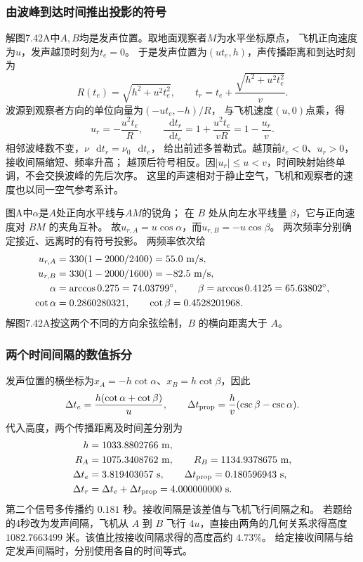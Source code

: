 \documentclass[UTF8,fontset=fandol,a4paper,11pt]{ctexart}
\newcommand{\dd}{\mathop{}\!\mathrm{d}}
\begin{document}
\subsubsection*{由波峰到达时间推出投影的符号}
解图7.42A中$A,B$均是发声位置。取地面观察者$M$为水平坐标原点，
飞机正向速度为$u$，发声越顶时刻为$t_e=0$。
于是发声位置为$(ut_e,h)$，声传播距离和到达时刻为
\[
R(t_e)=\sqrt{h^2+u^2t_e^2},\qquad
t_r=t_e+\frac{\sqrt{h^2+u^2t_e^2}}v.
\]
波源到观察者方向的单位向量为$(-ut_e,-h)/R$，
与飞机速度$(u,0)$点乘，得
\[
u_r=-\frac{u^2t_e}{R},\qquad
\frac{\dd t_r}{\dd t_e}
=1+\frac{u^2t_e}{vR}=1-\frac{u_r}{v}.
\]
相邻波峰数不变，$\nu\,\dd t_r=\nu_0\,\dd t_e$，
给出前述多普勒式。越顶前$t_e<0$、$u_r>0$，接收间隔缩短、频率升高；
越顶后符号相反。因$|u_r|\le u<v$，时间映射始终单调，不会交换波峰的先后次序。
这里的声速相对于静止空气，飞机和观察者的速度也以同一空气参考系计。

图A中$\alpha$是$A$处正向水平线与$AM$的锐角；
在 $B$ 处从向左水平线量 $\beta$，它与正向速度对 $BM$ 的夹角互补。
故$u_{r,A}=u\cos\alpha$，而$u_{r,B}=-u\cos\beta$。
两次频率分别确定接近、远离时的有符号投影。
两频率依次给
\[
\begin{aligned}
u_{r,A}&=330(1-2000/2400)=55.0\ {\rm m/s},\\
u_{r,B}&=330(1-2000/1600)=-82.5\ {\rm m/s},\\
\alpha&=\arccos0.275=74.03799^\circ,\qquad
\beta=\arccos0.4125=65.63802^\circ,\\
\cot\alpha&=0.2860280321,\qquad
\cot\beta=0.4528201968.
\end{aligned}
\]
解图7.42A按这两个不同的方向余弦绘制，$B$ 的横向距离大于 $A$。

\subsubsection*{两个时间间隔的数值拆分}
发声位置的横坐标为$x_A=-h\cot\alpha$、$x_B=h\cot\beta$，因此
\[
\Delta t_e=\frac{h(\cot\alpha+\cot\beta)}u,\qquad
\Delta t_{\rm prop}=\frac hv(\csc\beta-\csc\alpha).
\]
代入高度，两个传播距离及时间差分别为
\[
\begin{aligned}
h&=1033.8802766\ {\rm m},\\
R_A&=1075.3408762\ {\rm m},\qquad
R_B=1134.9378675\ {\rm m},\\
\Delta t_e&=3.819403057\ {\rm s},\qquad
\Delta t_{\rm prop}=0.180596943\ {\rm s},\\
\Delta t_r&=\Delta t_e+\Delta t_{\rm prop}=4.000000000\ {\rm s}.
\end{aligned}
\]
第二个信号多传播约 $0.181$ 秒。接收间隔是该差值与飞机飞行间隔之和。
若题给的4秒改为发声间隔，飞机从 $A$ 到 $B$ 飞行 $4u$，直接由两角的几何关系求得高度 $1082.7663499$ 米。该值比按接收间隔求得的高度高约 $4.73\%$。
给定接收间隔与给定发声间隔时，分别使用各自的时间等式。
\end{document}
